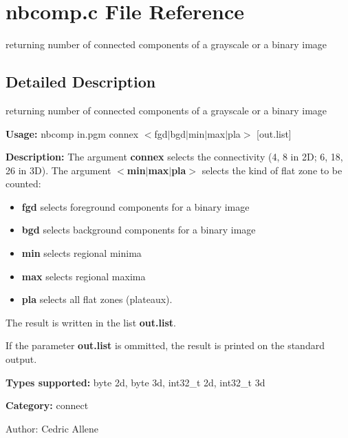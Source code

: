 \section{nbcomp.c File Reference}
\label{nbcomp_8c}
returning number of connected components of a grayscale or a binary image  




\label{_details}
\subsection{Detailed Description}
returning number of connected components of a grayscale or a binary image 

{\bf Usage:} nbcomp in.pgm connex $<$fgd$|$bgd$|$min$|$max$|$pla$>$ [out.list]

{\bf Description:} The argument {\bf connex} selects the connectivity (4, 8 in 2D; 6, 18, 26 in 3D). The argument {\bf $<$min$|$max$|$pla$>$} selects the kind of flat zone to be counted: \begin{itemize}
\item {\bf fgd} selects foreground components for a binary image \item {\bf bgd} selects background components for a binary image \item {\bf min} selects regional minima \item {\bf max} selects regional maxima \item {\bf pla} selects all flat zones (plateaux).\end{itemize}
The result is written in the list {\bf out.list}.

If the parameter {\bf out.list} is ommitted, the result is printed on the standard output.

{\bf Types supported:} byte 2d, byte 3d, int32\_\-t 2d, int32\_\-t 3d

{\bf Category:} connect

\begin{Desc}
\item[Author:]Cedric Allene \end{Desc}
